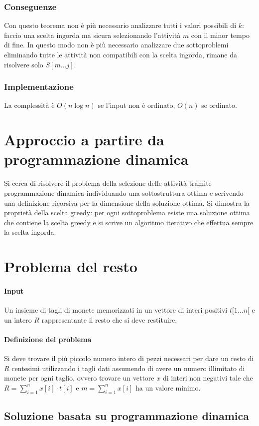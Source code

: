 		\subsubsection{Conseguenze}
		Con questo teorema non \`e pi\`u necessario analizzare tutti i valori possibili di $k$: faccio una scelta ingorda ma sicura selezionando l'attivit\`a $m$ con il minor tempo di fine.
		In questo modo non \`e pi\`u necessario analizzare due sottoproblemi eliminando tutte le attivit\`a non compatibili con la scelta ingorda, rimane da risolvere solo $S[m\dots j]$. 
		\subsubsection{Implementazione}
		
		La complessit\`a \`e $O(n\log n)$ se l'input non \`e ordinato, $O(n)$ se ordinato. 
	\section{Approccio a partire da programmazione dinamica}
	Si cerca di risolvere il problema della selezione delle attivit\`a tramite programmazione dinamica individuando una sottostruttura ottima e scrivendo una definizione ricorsiva per la
	dimensione della soluzione ottima. Si dimostra la propriet\`a della scelta greedy: per ogni sottoproblema esiste una soluzione ottima che contiene la scelta greedy e si scrive un
	algoritmo iterativo che effettua sempre la scelta ingorda.
	\section{Problema del resto}
	\paragraph{Input}
	Un insieme di tagli di monete memorizzati in un vettore di interi positivi $t[1\dots n[$ e un intero $R$ rappresentante il resto che si deve restituire.
	\paragraph{Definizione del problema}
	Si deve trovare il pi\`u piccolo numero intero di pezzi necessari per dare un resto di $R$ centesimi utilizzando i tagli dati assumendo di avere un numero illimitato di monete per ogni 
	taglio, ovvero trovare un vettore $x$ di interi non negativi tale che $R=\sum\limits_{i = 1}^nx[i]\cdot t[i]$ e $m=\sum\limits_{i = 1}^nx[i]$ ha un valore minimo.
	\subsection{Soluzione basata su programmazione dinamica}
